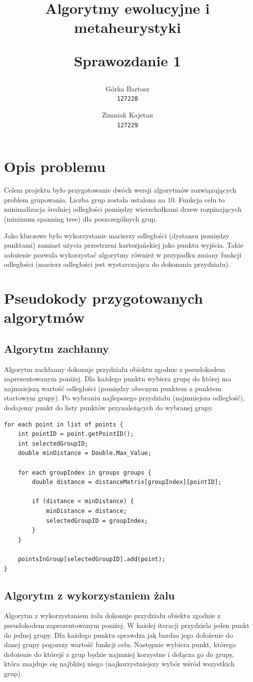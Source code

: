 \documentclass{mwart}
\title{
    \textbf{Algorytmy ewolucyjne i metaheurystyki}\\ 
    \begin{large} 
        Sprawozdanie 1
    \end{large}
}
\author{
    Górka Bartosz\\
  \texttt{127228}
  \and
  Zimniak Kajetan\\
  \texttt{127229}
}
\date{}
\begin{document}
\maketitle

\section{Opis problemu}
Celem projektu było przygotowanie dwóch wersji algorytmów rozwiązujących problem grupowania. Liczba grup została ustalona na $10$. Funkcja celu to minimalizacja średniej odległości pomiędzy wierzchołkami drzew rozpinających (minimum spanning tree) dla poszczególnych grup.

Jako kluczowe było wykorzystanie macierzy odległości (dystansu pomiędzy punktami) zamiast użycia przestrzeni kartezjańskiej jako punktu wyjścia. Takie założenie pozwala wykorzystać algorytmy również w przypadku zmiany funkcji odległości (macierz odległości jest wystarczająca do dokonania przydziału).

\section{Pseudokody przygotowanych algorytmów}
\subsection{Algorytm zachłanny}
Algorytm zachłanny dokonuje przydziału obiektu zgodnie z pseudokodem zaprezentowanym poniżej. Dla każdego punktu wybiera grupę do której ma najmniejszą wartość odległości (pomiędzy obecnym punktem a punktem startowym grupy). Po wybraniu najlepszego przydziału (najmniejsza odległość), dodajemy punkt do listy punktów przynależących do wybranej grupy.

\begin{lstlisting}[style=JavaStyle]
for each point in list of points {
    int pointID = point.getPointID();
    int selectedGroupID;
    double minDistance = Double.Max_Value;

    for each groupIndex in groups groups {
        double distance = distanceMatrix[groupIndex][pointID];
        
        if (distance < minDistance) {
            minDistance = distance;
            selectedGroupID = groupIndex;
        }
    }

    pointsInGroup[selectedGroupID].add(point);
}
\end{lstlisting}

\subsection{Algorytm z wykorzystaniem żalu}
Algorytm z wykorzystaniem żalu dokonuje przydziału obiektu zgodnie z pseudokodem zaprezentowanym poniżej. W każdej iteracji przydziela jeden punkt do jednej grupy. Dla każdego punktu sprawdza jak bardzo jego dołożenie do danej grupy pogorszy wartość funkcji celu. Następnie wybiera punkt, którego dołożenie do którejś z grup będzie najmniej korzystne i dołącza go do grupy, która znajduje się najbliżej niego (najkorzystniejszy wybór wśród wszystkich grup).
\end{document}
